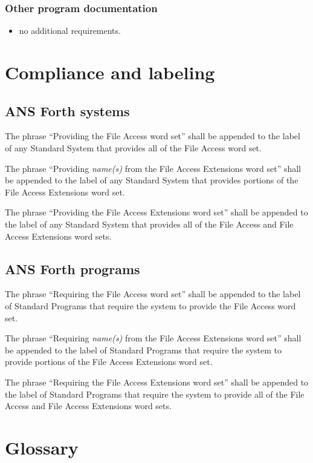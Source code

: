 \subsubsection{Other program documentation} %
\begin{itemize}
\item no additional requirements.
\end{itemize}

\section{Compliance and labeling} %

\subsection{ANS Forth systems} %

The phrase ``Providing the File Access word set'' shall be appended
to the label of any Standard System that provides all of the File
Access word set.

The phrase ``Providing \emph{name(s)} from the File Access Extensions
word set'' shall be appended to the label of any Standard System that
provides portions of the File Access Extensions word set.

The phrase ``Providing the File Access Extensions word set'' shall
be appended to the label of any Standard System that provides all of
the File Access and File Access Extensions word sets.

\subsection{ANS Forth programs} %

The phrase ``Requiring the File Access word set'' shall be appended
to the label of Standard Programs that require the system to provide
the File Access word set.

The phrase ``Requiring \emph{name(s)} from the File Access Extensions
word set'' shall be appended to the label of Standard Programs that
require the system to provide portions of the File Access Extensions
word set.

The phrase ``Requiring the File Access Extensions word set'' shall be
appended to the label of Standard Programs that require the system to
provide all of the File Access and File Access Extensions word sets.


\section{Glossary} %

